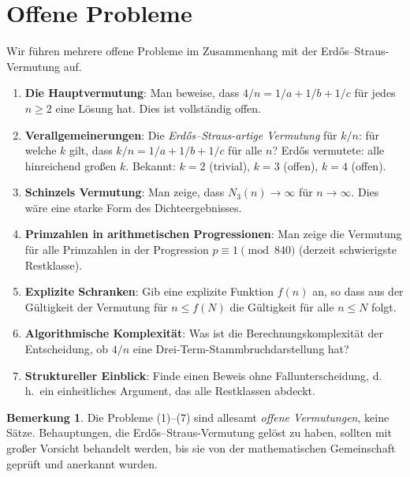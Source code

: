 \documentclass[12pt,a4paper]{amsart}
\theoremstyle{definition}
\newtheorem{remark}[theorem]{Bemerkung}
\begin{document}
\section{Offene Probleme}

Wir führen mehrere offene Probleme im Zusammenhang mit der
Erd\H{o}s--Straus-Vermutung auf.

\begin{enumerate}
\item \textbf{Die Hauptvermutung}: Man beweise, dass $4/n = 1/a + 1/b + 1/c$
      für jedes $n \geq 2$ eine Lösung hat.
      Dies ist vollständig offen.

\item \textbf{Verallgemeinerungen}: Die \emph{Erd\H{o}s--Straus-artige
      Vermutung} für $k/n$: für welche $k$ gilt, dass $k/n = 1/a + 1/b + 1/c$
      für alle $n$?  Erd\H{o}s vermutete: alle hinreichend großen $k$.
      Bekannt: $k = 2$ (trivial), $k = 3$ (offen), $k = 4$ (offen).

\item \textbf{Schinzels Vermutung}: Man zeige, dass $N_3(n) \to \infty$
      für $n \to \infty$.  Dies wäre eine starke Form des Dichteergebnisses.

\item \textbf{Primzahlen in arithmetischen Progressionen}: Man zeige die
      Vermutung für alle Primzahlen in der Progression $p \equiv 1 \pmod{840}$
      (derzeit schwierigste Restklasse).

\item \textbf{Explizite Schranken}: Gib eine explizite Funktion $f(n)$
      an, so dass aus der Gültigkeit der Vermutung für $n \leq f(N)$
      die Gültigkeit für alle $n \leq N$ folgt.

\item \textbf{Algorithmische Komplexität}: Was ist die Berechnungskomplexität
      der Entscheidung, ob $4/n$ eine Drei-Term-Stammbruchdarstellung hat?

\item \textbf{Struktureller Einblick}: Finde einen Beweis ohne Fallunterscheidung,
      d.\,h.\ ein einheitliches Argument, das alle Restklassen abdeckt.
\end{enumerate}

\begin{remark}
Die Probleme (1)--(7) sind allesamt \emph{offene Vermutungen}, keine
Sätze.  Behauptungen, die Erd\H{o}s--Straus-Vermutung gelöst zu haben,
sollten mit großer Vorsicht behandelt werden, bis sie von der
mathematischen Gemeinschaft geprüft und anerkannt wurden.
\end{remark}
\end{document}
